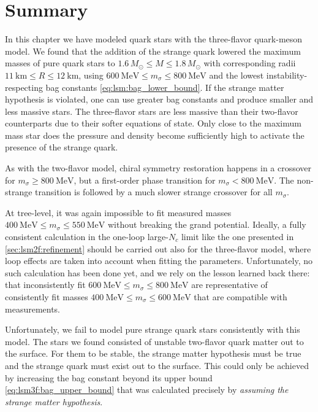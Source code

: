 \section{Summary}

In this chapter we have modeled quark stars with the three-flavor quark-meson model.
We found that the addition of the strange quark lowered the maximum masses of pure quark stars to $1.6 \, M_\odot \leq M \leq 1.8 \, M_\odot$
with corresponding radii $\SI{11}{\kilo\meter} \leq R \leq \SI{12}{\kilo\meter}$,
using $\SI{600}{\mega\electronvolt} \leq m_\sigma \leq \SI{800}{\mega\electronvolt}$ and the lowest instability-respecting bag constants \eqref{eq:lsm:bag_lower_bound}.
If the strange matter hypothesis is violated, one can use greater bag constants and produce smaller and less massive stars.
The three-flavor stars are less massive than their two-flavor counterparts
due to their softer equations of state.
Only close to the maximum mass star does the pressure and density become sufficiently high
to activate the presence of the strange quark.

As with the two-flavor model, chiral symmetry restoration happens in a crossover for $m_\sigma \geq \SI{800}{\mega\electronvolt}$,
but a first-order phase transition for $m_\sigma < \SI{800}{\mega\electronvolt}$.
The non-strange transition is followed by a much slower strange crossover for all $m_\sigma$.

At tree-level, it was again impossible to fit measured masses $\SI{400}{\mega\electronvolt} \leq m_\sigma \leq \SI{550}{\mega\electronvolt}$ without breaking the grand potential.
Ideally, a fully consistent calculation in the one-loop large-$N_c$ limit like the one presented in \cref{sec:lsm2f:refinement}
should be carried out also for the three-flavor model,
where loop effects are taken into account when fitting the parameters.
Unfortunately, no such calculation has been done yet,
and we rely on the lesson learned back there:
that inconsistently fit $\SI{600}{\mega\electronvolt} \leq m_\sigma \leq \SI{800}{\mega\electronvolt}$
are representative of consistently fit masses $\SI{400}{\mega\electronvolt} \leq m_\sigma \leq \SI{600}{\mega\electronvolt}$
that are compatible with measurements.

Unfortunately, we fail to model pure strange quark stars consistently with this model.
The stars we found consisted of unstable two-flavor quark matter out to the surface.
For them to be stable, the strange matter hypothesis must be true and the strange quark must exist out to the surface.
This could only be achieved by
increasing the bag constant beyond its upper bound \eqref{eq:lsm3f:bag_upper_bound} that was calculated precisely by \emph{assuming the strange matter hypothesis}.
